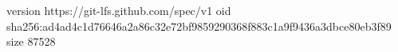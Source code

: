 version https://git-lfs.github.com/spec/v1
oid sha256:ad4ad4c1d76646a2a86c32e72bf9859290368f883c1a9f9436a3dbce80eb3f89
size 87528
